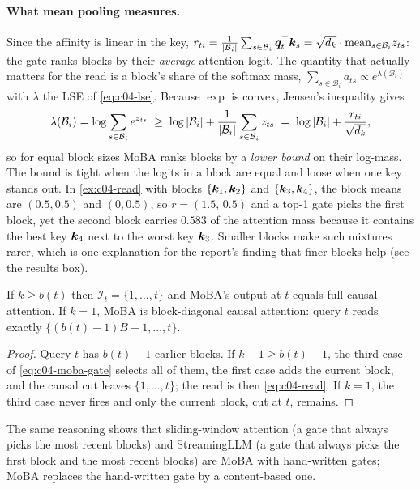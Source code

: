 \paragraph{What mean pooling measures.}
Since the affinity is linear in the key, $r_{ti}=\frac{1}{\left\lvert \mathcal{B}_i\right\rvert}\sum_{s\in\mathcal{B}_i}
\bm{q}_t^{\top}\bm{k}_s=\sqrt{d_k}\cdot\mathrm{mean}_{s\in\mathcal{B}_i}z_{ts}$: the gate ranks blocks by
their \emph{average} attention logit. The quantity that actually matters for the read is a
block's share of the softmax mass, $\sum_{s\in\mathcal{B}_i}a_{ts}\propto
e^{\lambda(\mathcal{B}_i)}$ with $\lambda$ the LSE of \eqref{eq:c04-lse}. Because $\exp$ is
convex, Jensen's inequality gives
\begin{equation}\label{eq:c04-jensen}
  \lambda(\mathcal{B}_i)=\log\sum_{s\in\mathcal{B}_i}e^{z_{ts}}
  \;\ge\; \log\left\lvert \mathcal{B}_i\right\rvert + \frac{1}{\left\lvert \mathcal{B}_i\right\rvert}\sum_{s\in\mathcal{B}_i}z_{ts}
  \;=\; \log\left\lvert \mathcal{B}_i\right\rvert + \frac{r_{ti}}{\sqrt{d_k}},
\end{equation}
so for equal block sizes MoBA ranks blocks by a \emph{lower bound} on their log-mass. The bound
is tight when the logits in a block are equal and loose when one key stands out. In
\cref{ex:c04-read} with blocks $\{\bm{k}_1,\bm{k}_2\}$ and $\{\bm{k}_3,\bm{k}_4\}$, the block means are
$(0.5,0.5)$ and $(0,0.5)$, so $r=(1.5,\,0.5)$ and a top-1 gate picks the first block, yet the
second block carries $0.583$ of the attention mass because it contains the best key $\bm{k}_4$
next to the worst key $\bm{k}_3$. Smaller blocks make such mixtures rarer, which is one
explanation for the report's finding that finer blocks help (see the results box).

\begin{proposition}\label{prop:c04-moba-full}
If $k\ge b(t)$ then $\mathcal{I}_t=\{1,\dots,t\}$ and MoBA's output at $t$ equals full causal
attention. If $k=1$, MoBA is block-diagonal causal attention: query $t$ reads exactly
$\{(b(t)-1)B+1,\dots,t\}$.
\end{proposition}
\begin{proof}
Query $t$ has $b(t)-1$ earlier blocks. If $k-1\ge b(t)-1$, the third case of
\eqref{eq:c04-moba-gate} selects all of them, the first case adds the current block, and the
causal cut leaves $\{1,\dots,t\}$; the read is then \eqref{eq:c04-read}. If $k=1$, the third case
never fires and only the current block, cut at $t$, remains.
\end{proof}

The same reasoning shows that sliding-window attention (a gate that always picks the most recent
blocks) and StreamingLLM (a gate that always picks the first block and the most recent blocks)
are MoBA with hand-written gates; MoBA replaces the hand-written gate by a content-based one.

